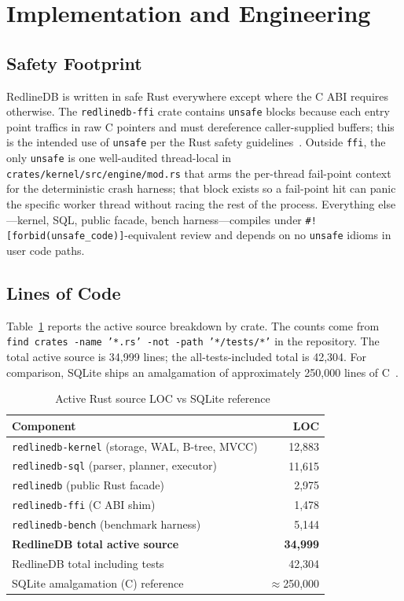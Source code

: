 \section{Implementation and Engineering}\label{sec:impl}

\subsection{Safety Footprint}
RedlineDB is written in safe Rust everywhere except where the C ABI
requires otherwise. The \texttt{redlinedb-ffi} crate contains
\texttt{unsafe} blocks because each entry point traffics in raw C
pointers and must dereference caller-supplied buffers; this is the
intended use of \texttt{unsafe} per the Rust safety
guidelines~\cite{rust_unsafe_guidelines,jung2021rustbelt}. Outside
\texttt{ffi}, the only \texttt{unsafe} is one well-audited
thread-local in \texttt{crates/kernel/src/engine/mod.rs} that arms
the per-thread fail-point context for the deterministic crash
harness; that block exists so a fail-point hit can panic the
specific worker thread without racing the rest of the
process. Everything else---kernel, SQL, public facade, bench
harness---compiles under \texttt{\#![forbid(unsafe\_code)]}-equivalent
review and depends on no \texttt{unsafe} idioms in user code paths.

\subsection{Lines of Code}
Table~\ref{tab:loc} reports the active source breakdown by crate. The
counts come from \texttt{find crates -name '*.rs' -not -path
'*/tests/*'} in the repository. The total active source is
34{,}999 lines; the all-tests-included total is 42{,}304. For
comparison, SQLite ships an amalgamation of approximately 250{,}000
lines of C~\cite{sqlite_footprint}.

\begin{table}[t]
\centering
\caption{Active Rust source LOC vs SQLite reference~\cite{sqlite_footprint}}
\label{tab:loc}
\renewcommand{\arraystretch}{1.05}
\begin{tabular}{@{}lr@{}}
\toprule
\textbf{Component} & \textbf{LOC} \\
\midrule
\texttt{redlinedb-kernel} (storage, WAL, B-tree, MVCC) & 12{,}883 \\
\texttt{redlinedb-sql} (parser, planner, executor) & 11{,}615 \\
\texttt{redlinedb} (public Rust facade) & 2{,}975 \\
\texttt{redlinedb-ffi} (C ABI shim) & 1{,}478 \\
\texttt{redlinedb-bench} (benchmark harness) & 5{,}144 \\
\midrule
\textbf{RedlineDB total active source} & \textbf{34{,}999} \\
RedlineDB total including tests & 42{,}304 \\
\midrule
SQLite amalgamation (C) reference & $\approx$250{,}000 \\
\bottomrule
\end{tabular}
\end{table}

